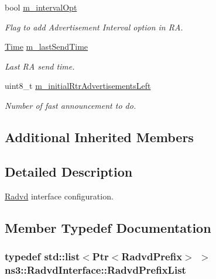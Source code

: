 \begin{DoxyCompactItemize}
bool \hyperlink{classns3_1_1RadvdInterface_a6ace6b10215006d7e2be7912eda6d6ab}{m\+\_\+interval\+Opt}
\begin{DoxyCompactList}\small\item\em Flag to add Advertisement Interval option in RA. \end{DoxyCompactList}\item 
\hyperlink{classns3_1_1Time}{Time} \hyperlink{classns3_1_1RadvdInterface_a7bba23c4eda35bcac1709c80533b7404}{m\+\_\+last\+Send\+Time}
\begin{DoxyCompactList}\small\item\em Last RA send time. \end{DoxyCompactList}\item 
uint8\+\_\+t \hyperlink{classns3_1_1RadvdInterface_a0a1a025101e4b511c07e344901238286}{m\+\_\+initial\+Rtr\+Advertisements\+Left}
\begin{DoxyCompactList}\small\item\em Number of fast announcement to do. \end{DoxyCompactList}\end{DoxyCompactItemize}
\subsection*{Additional Inherited Members}


\subsection{Detailed Description}
\hyperlink{classns3_1_1Radvd}{Radvd} interface configuration. 

\subsection{Member Typedef Documentation}
\subsubsection[{\texorpdfstring{Radvd\+Prefix\+List}{RadvdPrefixList}}]{\setlength{\rightskip}{0pt plus 5cm}typedef {\bf std\+::list}$<${\bf Ptr}$<${\bf Radvd\+Prefix}$>$ $>$ {\bf ns3\+::\+Radvd\+Interface\+::\+Radvd\+Prefix\+List}}\hypertarget{classns3_1_1RadvdInterface_a25f72232730563f395b822cf912e9f5e}{}\label{classns3_1_1RadvdInterface_a25f72232730563f395b822cf912e9f5e}


